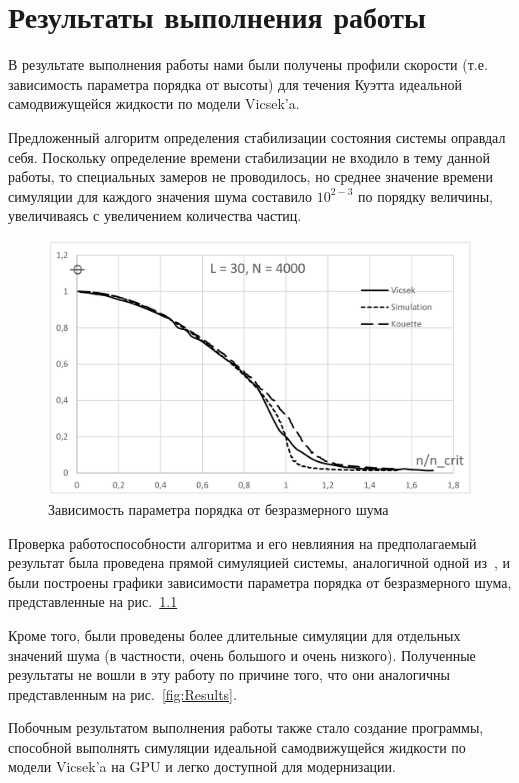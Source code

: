 \chapter{Результаты выполнения работы}
\label{ch:Results}

В результате выполнения работы нами были получены профили скорости (т.е. зависимость параметра порядка от высоты) для течения Куэтта идеальной самодвижущейся жидкости по модели Vicsek'a.

Предложенный алгоритм определения стабилизации состояния системы оправдал себя. Поскольку определение времени стабилизации не входило в тему данной работы, то специальных замеров не проводилось, но среднее значение времени симуляции для каждого значения шума составило $10^{2-3}$ по порядку величины, увеличиваясь с увеличением количества частиц.

\begin{figure}[H]
    \centering
        \includegraphics[height=0.33\textheight]{Images/CheckerResult}
    \caption{Зависимость параметра порядка от безразмерного шума}
    \label{fig:CheckerResults}
\end{figure}

Проверка работоспособности алгоритма и его невлияния на предполагаемый результат была проведена прямой симуляцией системы, аналогичной одной из~\cite{vicsek1995}, и были построены графики зависимости параметра порядка от безразмерного шума, представленные на рис.~\ref{fig:CheckerResults}

Кроме того, были проведены более длительные симуляции для отдельных значений шума (в частности, очень большого и очень низкого). Полученные результаты не вошли в эту работу по причине того, что они аналогичны представленным на рис.~\ref{fig:Results}.

Побочным результатом выполнения работы также стало создание программы, способной выполнять симуляции идеальной самодвижущейся жидкости по модели Vicsek'a на GPU и легко доступной для модернизации.

